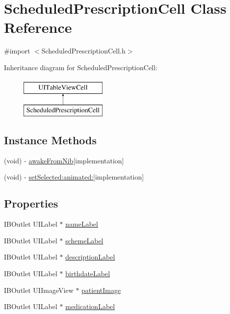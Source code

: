 \hypertarget{interface_scheduled_prescription_cell}{}\section{Scheduled\+Prescription\+Cell Class Reference}
\label{interface_scheduled_prescription_cell}


{\ttfamily \#import $<$Scheduled\+Prescription\+Cell.\+h$>$}

Inheritance diagram for Scheduled\+Prescription\+Cell\+:\begin{figure}[H]
\begin{center}
\leavevmode
\includegraphics[height=2.000000cm]{interface_scheduled_prescription_cell}
\end{center}
\end{figure}
\subsection*{Instance Methods}
\begin{DoxyCompactItemize}
\item 
(void) -\/ \hyperlink{interface_scheduled_prescription_cell_ab72d569fbb1d2f55c0127380fb22ae56}{awake\+From\+Nib}{\ttfamily  \mbox{[}implementation\mbox{]}}
\item 
(void) -\/ \hyperlink{interface_scheduled_prescription_cell_afae6a516637d0b128d8fe20a91a5acb1}{set\+Selected\+:animated\+:}{\ttfamily  \mbox{[}implementation\mbox{]}}
\end{DoxyCompactItemize}
\subsection*{Properties}
\begin{DoxyCompactItemize}
\item 
I\+B\+Outlet U\+I\+Label $\ast$ \hyperlink{interface_scheduled_prescription_cell_a2b0fc54c50ecd066b11ec4af56108eda}{name\+Label}
\item 
I\+B\+Outlet U\+I\+Label $\ast$ \hyperlink{interface_scheduled_prescription_cell_a81fb8091fc4592db2b05250a6e5d4882}{scheme\+Label}
\item 
I\+B\+Outlet U\+I\+Label $\ast$ \hyperlink{interface_scheduled_prescription_cell_ae82b83a0d3f6541e4cd416dbc153722c}{description\+Label}
\item 
I\+B\+Outlet U\+I\+Label $\ast$ \hyperlink{interface_scheduled_prescription_cell_aa19345bc59f69c9bd6944bd61e26caef}{birthdate\+Label}
\item 
I\+B\+Outlet U\+I\+Image\+View $\ast$ \hyperlink{interface_scheduled_prescription_cell_a79ab62aca7d99b031bcc1206b5f812d1}{patient\+Image}
\item 
I\+B\+Outlet U\+I\+Label $\ast$ \hyperlink{interface_scheduled_prescription_cell_ac284af3bb49cd1801496b32e681ef7c1}{medication\+Label}
\end{DoxyCompactItemize}


